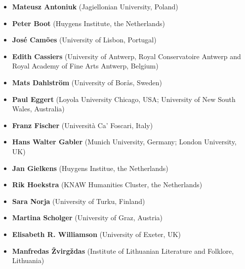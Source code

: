 \begin{itemize}
    \item \textbf{Mateusz Antoniuk} (Jagiellonian University, Poland)
    \item \textbf{Peter Boot} (Huygens Institute, the Netherlands)
    \item \textbf{José Camões} (University of Lisbon, Portugal)
    \item \textbf{Edith Cassiers} (University of Antwerp, Royal Conservatoire Antwerp and Royal Academy of Fine Arts Antwerp, Belgium)
    \item \textbf{Mats Dahlström} (University of Borås, Sweden)
    \item \textbf{Paul Eggert} (Loyola University Chicago, USA;  University of New South Wales, Australia)
    \item \textbf{Franz Fischer} (Università Ca' Foscari, Italy)
    \item \textbf{Hans Walter Gabler} (Munich University, Germany; London University, UK) 
    \item \textbf{Jan Gielkens} (Huygens Institue, the Netherlands)
    \item \textbf{Rik Hoekstra} (KNAW Humanities Cluster, the Netherlands)
    \item \textbf{Sara Norja} (University of Turku, Finland)
    \item \textbf{Martina Scholger} (University of Graz, Austria)
    \item \textbf{Elisabeth R. Williamson} (University of Exeter, UK)
    \item \textbf{Manfredas Žvirgždas} (Institute of Lithuanian Literature and Folklore, Lithuania)
    
\end{itemize}